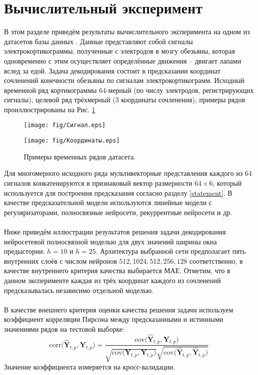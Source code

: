 \documentclass[12pt]{article}
\begin{document}
\newpage
\section{Вычислительный эксперимент}
В этом разделе приведём результаты вычислительного эксперимента на одном из датасетов базы данных \cite{ECoG}. Данные представляют собой сигналы электрокортикограммы, полученные с электродов в мозгу обезьяны, которая одновременно с этим осуществляет определённые движения -- двигает лапами вслед  за едой. Задача декодирования состоит в предсказании координат сочленений конечности обезьяны по сигналам электрокортикограмм. Исходный временной ряд кортикограммы $64$-мерный (по числу электродов, регистрирующих сигналы), целевой ряд трёхмерный (3 координаты сочленения), примеры рядов проиллюстрированы на Рис. \ref{fig:example}

\begin{figure}[h]
    \captionsetup{labelformat=empty}
    \centering
     \texttt{[image: fig/Сигнал.eps]}
     
\end{figure}
\begin{figure}[h]
    \centering
    \texttt{[image: fig/Координаты.eps]}
    \caption{Примеры временных рядов датасета.}
    \label{fig:example}
\end{figure}

\newpage
Для многомерного исходного ряда мультивекторные представления каждого из $64$ сигналов конкатенируются в признаковый вектор размерности $64 \times 6$, который используется для построения предсказания согласно разделу \ref{statement}. В качестве предсказательной модели используются линейные модели с регуляризаторами, полносвязные нейросети, рекуррентные нейросети и др.
\paragraph{}
Ниже приведём иллюстрации результатов решения задачи декодирования нейросетевой полносвязной моделью для двух значений ширины окна предыстории: $h = 10$ и $h = 25$. Архитектура выбранной сети предполагает пять внутренних слоёв с числом нейронов $512, 1024, 512, 256, 128$ соответственно, в качестве внутреннего критерия качества выбирается МАЕ. Отметим, что в данном эксперименте каждая из трёх координат каждого из сочленений предсказывалась независимо отдельной моделью. \paragraph{}
В качестве внешнего критерия оценки качества решения задачи используем коэффициент корреляции Пирсона между предсказанными и истинными значениями рядов на тестовой выборке:
$$ \text{corr} \Bigg( \hat{\textbf{Y}}_{t,p}, \textbf{Y}_{t,p} \Bigg)  = \frac{\text{cov} \Bigg( \hat{\textbf{Y}}_{t,p}, \textbf{Y}_{t,p} \Bigg)}{\sqrt{\text{cov} \Bigg( \textbf{Y}_{t,p}, \textbf{Y}_{t,p} \Bigg)} \sqrt{\text{cov} \Bigg( \hat{\textbf{Y}}_{t,p}, \hat{\textbf{Y}}_{t,p} \Bigg)}}$$
Значение коэффициента измеряется на кросс-валидации.
\end{document}
